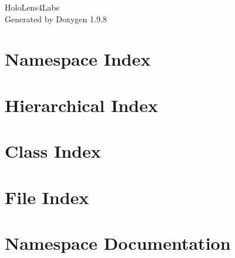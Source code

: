 \documentclass[twoside]{book}
\newcommand{\+}{\discretionary{\mbox{\scriptsize$\hookleftarrow$}}{}{}}
\newcommand{\clearemptydoublepage}{%
    \newpage{\pagestyle{empty}\cleardoublepage}%
  }
\begin{document}
  \raggedbottom
    \hypersetup{pageanchor=false,
                bookmarksnumbered=true,
                pdfencoding=unicode
               }
  \begin{titlepage}
  \vspace*{7cm}
  \begin{center}%
  {\Large Holo\+Lens4\+Labs}\\
  \vspace*{1cm}
  {\large Generated by Doxygen 1.9.8}\\
  \end{center}
  \end{titlepage}
  \clearemptydoublepage
  \tableofcontents
  \clearemptydoublepage
  \hypersetup{pageanchor=true}
\chapter{Namespace Index}

\chapter{Hierarchical Index}

\chapter{Class Index}

\chapter{File Index}

\chapter{Namespace Documentation}




















\end{document}
